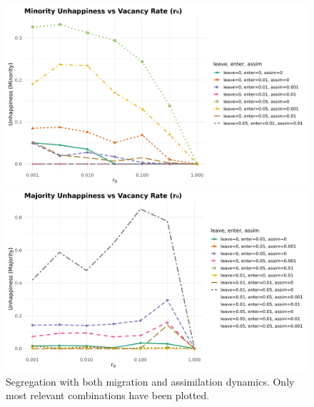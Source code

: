 \begin{figure}[htbp]
    \centering
    \begin{minipage}[t]{0.48\linewidth}
        \centering
        \includegraphics[width=\linewidth]{images/segregation_plot_migration_ass_minority_fixed.png}
        \caption{}
        
    \end{minipage}
    \hfill
    \begin{minipage}[t]{0.48\linewidth}
        \centering
        \includegraphics[width=\linewidth]{images/segregation_plot_migration_ass_majority_fixed.png}
        \caption{}
        
    \end{minipage}
    \caption{Segregation with both migration and assimilation dynamics. Only most relevant combinations have been plotted.}
    \label{fig:last}
    
\end{figure}
